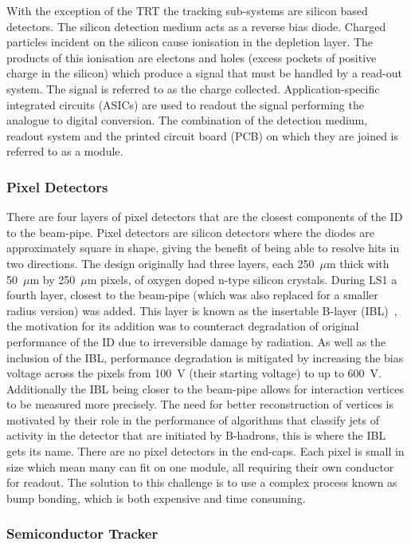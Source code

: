 With the exception of the TRT the tracking sub-systems are silicon based
detectors. The silicon detection medium acts as a reverse bias diode. Charged
particles incident on the silicon cause ionisation in the depletion layer. The
products of this ionisation are electons and holes (excess pockets of positive
charge in the silicon) which produce a signal that must be handled by a
read-out system. The signal is referred to as the charge collected.
Application-specific integrated circuits (ASICs) are used to readout the signal
performing the analogue to digital conversion. The combination of the detection
medium, readout system and the printed circuit board (PCB) on which they are
joined is referred to as a module.

\subsubsection{Pixel Detectors}

There are four layers of pixel detectors that are the closest components of the
ID to the beam-pipe. Pixel detectors are silicon detectors where the diodes are
approximately square in shape, giving the benefit of being able to resolve hits
in two directions. The design originally had three layers, each 250~$\mu$m
thick with 50~$\mu$m by 250~$\mu$m pixels, of oxygen doped n-type silicon
crystals. During LS1 a fourth layer, closest to the beam-pipe (which was also
replaced for a smaller radius version) was added. This layer is known as the
insertable B-layer (IBL)~\cite{IBL-TDR}, the motivation for its addition was to
counteract degradation of original performance of the ID due to irreversible
damage by radiation. As well as the inclusion of the IBL, performance degradation
is mitigated by increasing the bias voltage across the pixels from 100~V (their
starting voltage) to up to 600~V. Additionally the IBL being closer to the
beam-pipe allows for interaction vertices to be measured more precisely. The
need for better reconstruction of vertices is motivated by their role in the
performance of algorithms that classify jets of activity in the detector that
are initiated by B-hadrons, this is where the IBL gets its name. There are no
pixel detectors in the end-caps. Each pixel is small in size which mean many can
fit on one module, all requiring their own conductor for readout. The solution
to this challenge is to use a complex process known as bump bonding, which is
both expensive and time consuming.

\subsubsection{Semiconductor Tracker}

